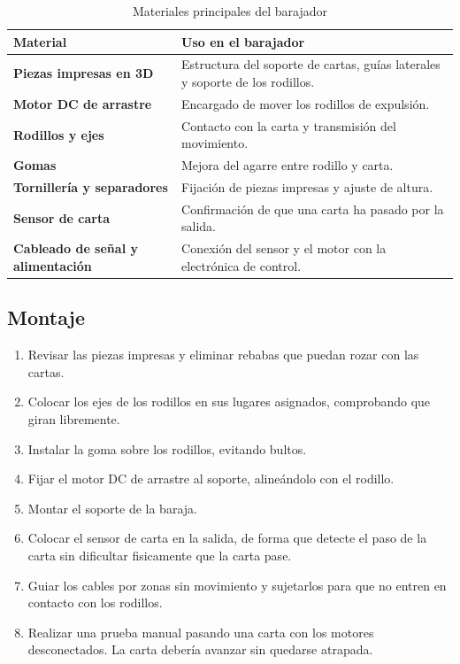 \documentclass[a4paper, 11pt]{article}
\begin{document}
\begin{table}[H]
\centering
\small
\begin{tabularx}{\textwidth}{>{\bfseries}p{}X}
\hline
\textbf{Material} & \textbf{Uso en el barajador} \\
\hline
Piezas impresas en 3D & Estructura del soporte de cartas, guías laterales y soporte de los rodillos. \\
Motor DC de arrastre & Encargado de mover los rodillos de expulsión. \\
Rodillos y ejes & Contacto con la carta y transmisión del movimiento. \\
Gomas & Mejora del agarre entre rodillo y carta. \\
Tornillería y separadores & Fijación de piezas impresas y ajuste de altura. \\
Sensor de carta & Confirmación de que una carta ha pasado por la salida. \\
Cableado de señal y alimentación & Conexión del sensor y el motor con la electrónica de control. \\
\hline
\end{tabularx}
\caption{Materiales principales del barajador}
\label{tab:manual_barajador_materiales}
\end{table}

\subsection{Montaje}

\begin{enumerate}
    \item Revisar las piezas impresas y eliminar rebabas que puedan rozar con las cartas.
    \item Colocar los ejes de los rodillos en sus lugares asignados, comprobando que giran libremente.
    \item Instalar la goma sobre los rodillos, evitando bultos.
    \item Fijar el motor DC de arrastre al soporte, alineándolo con el rodillo.
    \item Montar el soporte de la baraja.
    \item Colocar el sensor de carta en la salida, de forma que detecte el paso de la carta sin dificultar fisicamente que la carta pase.
    \item Guiar los cables por zonas sin movimiento y sujetarlos para que no entren en contacto con los rodillos.
    \item Realizar una prueba manual pasando una carta con los motores desconectados. La carta debería avanzar sin quedarse atrapada.
\end{enumerate}
\end{document}
